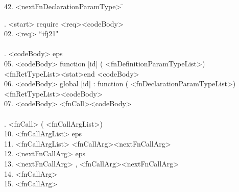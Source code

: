 \documentclass[a4paper, 12pt]{article}
\begin{document}
\begin{tabbing}
42. \textless nextFnDeclarationParamType\textgreater \; \= \textrightarrow \quad \= \kill

. \textless start\textgreater                      \> \textrightarrow \>  require \textless req\textgreater \textless codeBody\textgreater \\
02. \textless req\textgreater                        \> \textrightarrow \>   ``ifj21"  \\\\

. \textless codeBody\textgreater                   \> \textrightarrow \>  eps \\
05. \textless codeBody\textgreater                   \> \textrightarrow \>  function [id] ( \textless fnDefinitionParamTypeList\textgreater ) \\ \> \> \textless fnRetTypeList\textgreater \textless stat\textgreater end \textless codeBody\textgreater \\
06. \textless codeBody\textgreater                   \> \textrightarrow \>  global [id] : function ( \textless fnDeclarationParamTypeList\textgreater )\\ \> \> \textless fnRetTypeList\textgreater \textless codeBody\textgreater \\
07. \textless codeBody\textgreater                   \> \textrightarrow \>  [id] \textless fnCall\textgreater \textless codeBody\textgreater \\ \\

. \textless fnCall\textgreater                     \> \textrightarrow \>  ( \textless fnCallArgList\textgreater ) \\
10. \textless fnCallArgList\textgreater              \> \textrightarrow \>  eps \\
11. \textless fnCallArgList\textgreater              \> \textrightarrow \>  \textless fnCallArg\textgreater \textless nextFnCallArg\textgreater \\
12. \textless nextFnCallArg\textgreater              \> \textrightarrow \>  eps \\
13. \textless nextFnCallArg\textgreater              \> \textrightarrow \>  , \textless fnCallArg\textgreater \textless nextFnCallArg\textgreater \\
14. \textless fnCallArg\textgreater                  \> \textrightarrow \>  [id] \\
15. \textless fnCallArg\textgreater                  \> \textrightarrow \>  [literal] \\ \\


\end{tabbing}
\end{document}
